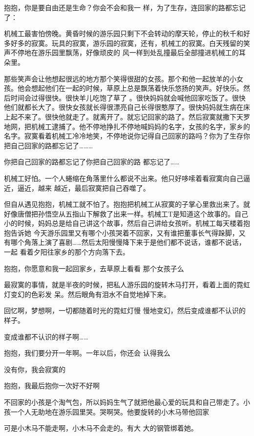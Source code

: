 \documentclass{article}
\begin{document}
抱抱，你是要自由还是生命？你会不会和我一
样，为了生存，连回家的路都忘记了： 

机械工最害怕傍晚。黄昏时候的游乐园只剩下不会转动的摩天轮，停止的秋千和好多好多的寂寞。玩具的寂寞，游乐园的寂寞，还有，机械工的寂寞。白天残留的笑声不停地在游乐园里飘荡，好像顽皮的
风一样到处乱撞最后全部撞进机械工的耳朵里。 

那些笑声会让他想起很远的地方那个笑得很甜的女孩。那个和他一起放羊的小女孩。他会想起他们在一起的时候，草原上总是飘荡着快乐悠扬的笑声。好快乐。然后时间会过得很快。很快羊儿吃饱了草了
\newpage
。很快妈妈就会喊他回家吃饭了。很快他们就都长大了。很快女孩就长得很漂亮自己长得很憨厚了。很快妈妈就生病在床上起不来了。很快他就走了。就离开了。就忘记回家的路了。然后寂寞就撒下天罗地网，把机械工逮捕了。他不停地挣扎不停地喊妈妈的名字，女孩的名字，家乡的名字。寂寞看着机械工冷冷地笑，不停地说你记得自己回家的路吗？你为了生存你
把自己回家的路都忘记了……… 

你把自己回家的路都忘记了你把自己回家的路
都忘记了…… 

机械工好怕。一个人蜷缩在角落里什么都说不出来。他只好哆嗦着看寂寞向自己逼近，逼近，越来
越近，最后寂寞把自己吞噬了。 

但自从遇见抱抱，机械工就不怕了。抱抱把机械工从寂寞的子掌心里救出来了。就好像唐僧把孙悟空从五指山下解救了出来一样。机械工T是知道这个故事的。自己小的时候，妈妈总是给自己讲这个故事，然后自己讲给女孩听。机械工每天楼着抱抱告诉她
\newpage
今天游乐园里又有哪个小孩哭着不回家，又有谁把董事长气得跺脚，又有哪个角落上演了喜剧……然后太阳慢慢降下来于是他们都不说话，谁都不说话，一起
看着夕阳往家乡的那个方向落下去。 

抱抱，你愿意和我一起回家乡，去草原上看看
那个女孩子么 

最寂寞的事情，就是半夜的时候，把私人游乐园的旋转木马打开，看着上面的霓虹灯变幻的色彩发
呆。然后眼角有泪水不自觉地掉下来。 

回忆啊，梦想啊，一切都随着时光的霓虹灯慢
慢地变幻，然后变成谁都不认识的样子。 


变成谁都不认识的样子啊…… 

抱抱，我们要分开一年啊。一年以后，你还会
认得我么 


\newpage

没有你，我会寂寞的 


抱抱，我最后抱你一次好不好啊 

不回家的小孩是个淘气包，所以妈妈生气了就把他最心爱的玩具和自己带走了。小孩一个人无助地在游乐园里哭。哭啊哭。他要旋转的小木马带他回家
 

可是小木马不能走啊，小木马不会走的。有大
大的钢管绑着她。 
\end{document}
